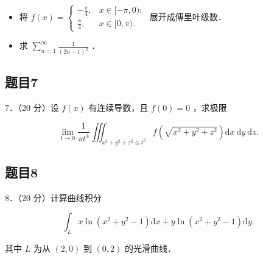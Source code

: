 \documentclass{article}
\begin{document}
\begin{itemize}
  \item[（1）] 将 \(f(x)=\left\{\begin{array}{ll}-\frac{\pi}{4}, & x \in[-\pi, 0) ; \\ \frac{\pi}{4}, & x \in[0, \pi) .\end{array}\right.\) 展开成傅里叶级数．
  \item[（2）] 求 \(\sum_{n=1}^{\infty} \frac{1}{(2 n-1)^{2}}\) ．
\end{itemize}

\subsection{题目7}
7．（20 分）设 \(f(x)\) 有连续导数，且 \(f(0)=0\) ，求极限

\[
\lim _{t \rightarrow 0} \frac{1}{\pi t^{4}} \iiint_{x^{2}+y^{2}+z^{2} \leq t^{2}} f\left(\sqrt{x^{2}+y^{2}+z^{2}}\right) \mathrm{d} x \mathrm{~d} y \mathrm{~d} z .
\]

\subsection{题目8}
8．（20 分）计算曲线积分

\[
\int_{L} x \ln \left(x^{2}+y^{2}-1\right) \mathrm{d} x+y \ln \left(x^{2}+y^{2}-1\right) \mathrm{d} y .
\]

其中 \(L\) 为从 \((2,0)\) 到 \((0,2)\) 的光滑曲线．
\end{document}
